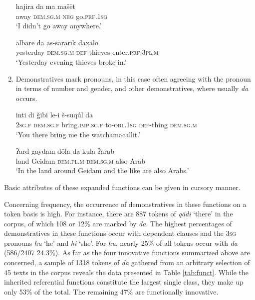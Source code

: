 \documentclass[output=paper]{langsci/langscibook}
\begin{document}
\begin{enumerate}[leftmargin=*]
\ea\label{hajira} 
\gll hajira da ma mašēt\\
     away \textsc{dem.sg.m} \textsc{neg} go.\textsc{prf.1sg}\\
\glt ‘I didn’t go away anywhere.’
\z

\ea\label{albare}
\gll albāre da as-sarārīk daxalo\\
     yesterday \textsc{dem.sg.m} \textsc{def-}thieves enter.\textsc{prf.3pl.m}\\
\glt ‘Yesterday evening thieves broke in.’
\z

\item Demonstratives mark pronouns, in this case often agreeing with the pronoun in terms of number and gender, and other demonstratives, where usually \textit{da} occurs.

\ea\label{suqul}
\ea
\gll inti di ǧībi le-i š-suqúl da\\
     \textsc{2sg.f} \textsc{dem.sg.f} bring.\textsc{imp.sg.f} to-\textsc{obl.1sg} \textsc{def-}thing \textsc{dem.sg.m}\\
\glt ‘You there bring me the watchamacallit.’
\z

\ea\label{ard}  
\gll ʔard gaydam dōla da kula ʔarab\\
     land Geidam \textsc{dem.pl.m} \textsc{dem.sg.m} also Arab\\
\glt ‘In the land around Geidam and the like are also Arabs.’
\z
\z

\end{enumerate}

Basic attributes of these expanded functions can be given in cursory manner.

Concerning frequency, the occurrence of demonstratives in these functions on a token basis is high. For instance, there are 887 tokens of \textit{qādi} ‘there’ in the corpus, of which 108 or 12\% are marked by \textit{da}. The highest percentages of demonstratives in these functions occur with dependent clauses and the 3\textsc{sg} pronouns \textit{hu} ‘he’ and \textit{hi} ‘she’. For \textit{hu}, nearly 25\% of all tokens occur with \textit{da} (586/2407 24.3\%). As far as the four innovative functions summarized above are concerned, a sample of 1318 tokens of \textit{da} gathered from an arbitrary selection of 45 texts in the corpus reveals the data presented in Table \ref{tab:funct}. While the inherited referential functions constitute the largest single class, they make up only 53\% of the total. The remaining 47\% are functionally innovative.
\end{document}
